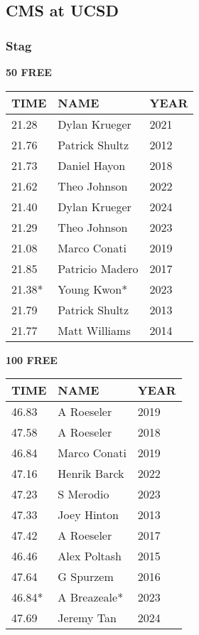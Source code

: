 \vspace{0.4cm}

\newpage

\subsection{CMS at UCSD}
\subsubsection{Stag}

\begin{minipage}[t]{0.48\textwidth}
\centering
\textbf{50 FREE}\\[0.05cm]
\begin{tabular}{@{}p{1.8cm}p{2.8cm}p{1.2cm}@{}}
\hline
\textbf{TIME} & \textbf{NAME} & \textbf{YEAR} \\
\hline
21.28 & Dylan Krueger & 2021 \\
21.76 & Patrick Shultz & 2012 \\
21.73 & Daniel Hayon & 2018 \\
21.62 & Theo Johnson & 2022 \\
21.40 & Dylan Krueger & 2024 \\
21.29 & Theo Johnson & 2023 \\
21.08 & Marco Conati & 2019 \\
21.85 & Patricio Madero & 2017 \\
21.38* & Young Kwon* & 2023 \\
21.79 & Patrick Shultz & 2013 \\
21.77 & Matt Williams & 2014 \\
\hline
\end{tabular}
\end{minipage}\hfill
\begin{minipage}[t]{0.48\textwidth}
\centering
\textbf{100 FREE}\\[0.05cm]
\begin{tabular}{@{}p{1.8cm}p{2.8cm}p{1.2cm}@{}}
\hline
\textbf{TIME} & \textbf{NAME} & \textbf{YEAR} \\
\hline
46.83 & A Roeseler & 2019 \\
47.58 & A Roeseler & 2018 \\
46.84 & Marco Conati & 2019 \\
47.16 & Henrik Barck & 2022 \\
47.23 & S Merodio & 2023 \\
47.33 & Joey Hinton & 2013 \\
47.42 & A Roeseler & 2017 \\
46.46 & Alex Poltash & 2015 \\
47.64 & G Spurzem & 2016 \\
46.84* & A Breazeale* & 2023 \\
47.69 & Jeremy Tan & 2024 \\
\hline
\end{tabular}
\end{minipage}

